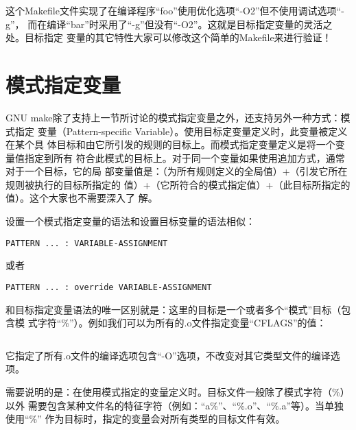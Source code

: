 这个Makefile文件实现了在编译程序“foo”使用优化选项“-O2”但不使用调试选项“-g”，
而在编译“bar”时采用了“-g”但没有“-O2”。这就是目标指定变量的灵活之处。目标指定
变量的其它特性大家可以修改这个简单的Makefile来进行验证！

\section{模式指定变量}
GNU make除了支持上一节所讨论的模式指定变量之外，还支持另外一种方式：模式指定
变量（Pattern-specific Variable）。使用目标定变量定义时，此变量被定义在某个具
体目标和由它所引发的规则的目标上。而模式指定变量定义是将一个变量值指定到所有
符合此模式的目标上。对于同一个变量如果使用追加方式，通常对于一个目标，它的局
部变量值是：（为所有规则定义的全局值）+（引发它所在规则被执行的目标所指定的
值）+（它所符合的模式指定值）+（此目标所指定的值）。这个大家也不需要深入了
解。

设置一个模式指定变量的语法和设置目标变量的语法相似：
\begin{Verbatim}[]
PATTERN ... : VARIABLE-ASSIGNMENT
\end{Verbatim}
\noindent 或者
\begin{Verbatim}[]
PATTERN ... : override VARIABLE-ASSIGNMENT
\end{Verbatim}

和目标指定变量语法的唯一区别就是：这里的目标是一个或者多个“模式”目标（包含模
式字符“\%”）。例如我们可以为所有的.o文件指定变量“CFLAGS”的值：
\begin{Verbatim}[]
%.o : CFLAGS += -O
\end{Verbatim}

它指定了所有.o文件的编译选项包含“-O”选项，不改变对其它类型文件的编译选项。

需要说明的是：在使用模式指定的变量定义时。目标文件一般除了模式字符（\%）以外
需要包含某种文件名的特征字符（例如：“a\%”、“\%.o”、“\%.a”等）。当单独使用“\%”
作为目标时，指定的变量会对所有类型的目标文件有效。

